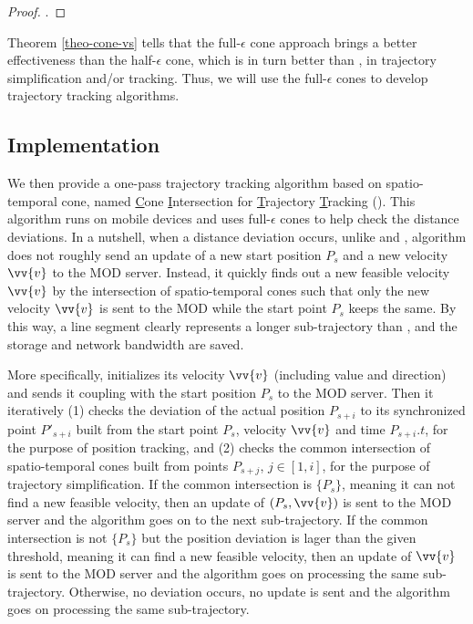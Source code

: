 \begin{proof}
	\todo.
\end{proof}

Theorem \ref{theo-cone-vs} tells that the full-$\epsilon$ cone approach brings a better effectiveness than the half-$\epsilon$ cone, which is in turn better than \ldrh, in trajectory simplification and/or tracking. Thus, we will use the full-$\epsilon$ cones to develop trajectory tracking algorithms.

\subsection{Implementation}
We then provide a one-pass trajectory tracking algorithm based on spatio-temporal cone, named \underline{C}one \underline{I}ntersection for \underline{T}rajectory \underline{T}racking (\citt). This algorithm runs on mobile devices and uses full-$\epsilon$ cones to help check the distance deviations. In a nutshell, when a distance deviation occurs, unlike \ldr and \ldrh, algorithm \citt does not roughly send an update of a new start position $P_s$ and a new velocity $\vv{v}$ to the MOD server. Instead, it quickly finds out a new feasible velocity $\vv{v}$ by the intersection of spatio-temporal cones such that only the new velocity $\vv{v}$ is sent to the MOD while the start point $P_s$ keeps the same. By this way, a line segment clearly represents a longer sub-trajectory than \ldrh, and the storage and network bandwidth are saved.

More specifically, \citt initializes its velocity $\vv{v}$ (including value and direction) and sends it coupling with the start position $P_s$ to the MOD server. Then it iteratively (1) checks the deviation of the actual position $P_{s+i}$ to its synchronized point $P'_{s+i}$ built from the start point $P_s$, velocity $\vv{v}$ and time $P_{s+i}.t$, for the purpose of position tracking, and (2) checks the common intersection of spatio-temporal cones built from points $P_{s+j}$, $j \in [1, i]$, for the purpose of trajectory simplification.
%
If the common intersection is $\{P_s\}$, meaning it can not find a new feasible velocity,
then an update of $(P_s, \vv{v})$ is sent to the MOD server and the algorithm goes on to the next sub-trajectory.
%
If the common intersection is not $\{P_s\}$ but the position deviation is lager than the given threshold, meaning it can find a new feasible velocity, then an update of $\vv{v}$ is sent to the MOD server and the algorithm goes on processing the same sub-trajectory.
%
Otherwise, no deviation occurs, no update is sent and the algorithm goes on processing the same sub-trajectory.

